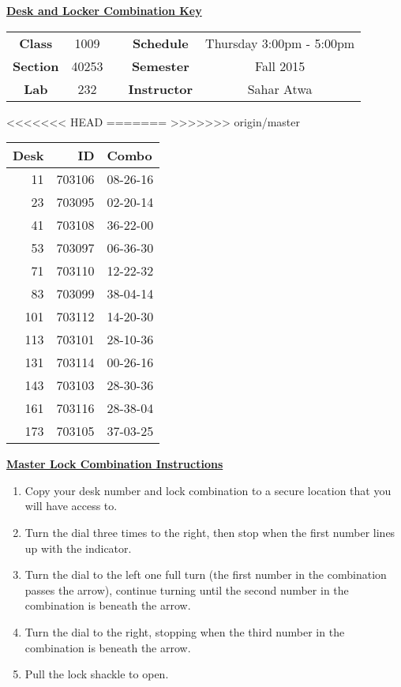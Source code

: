 \documentclass[12pt]{article}
\begin{document}
\thispagestyle{empty}

\begin{center}
	{\huge\textbf{\underline{ Desk and Locker Combination Key}}}
\end{center}


\begin{table}[h]
  \centering
  \begin{tabular}{ccccc}

  \textbf{Class} & 1009 & {\qquad} &\textbf{Schedule} & Thursday 3:00pm - 5:00pm \\
  \textbf{Section} & 40253 & {\qquad} & \textbf{Semester} & Fall 2015 \\
  \textbf{Lab} & 232 & {\qquad} & \textbf{Instructor} & Sahar Atwa \\
  \end{tabular}
\end{table}
<<<<<<< HEAD
 \vspace{0.1in}
=======
 \vspace{0.5in}
>>>>>>> origin/master
\begin{minipage}{0.4\textwidth}

\begin{tabular}{rrl}
\toprule
 Desk &      ID &     Combo \\
\midrule
   11 &  703106 &  08-26-16 \\
   23 &  703095 &  02-20-14 \\
   41 &  703108 &  36-22-00 \\
   53 &  703097 &  06-36-30 \\
   71 &  703110 &  12-22-32 \\
   83 &  703099 &  38-04-14 \\
  101 &  703112 &  14-20-30 \\
  113 &  703101 &  28-10-36 \\
  131 &  703114 &  00-26-16 \\
  143 &  703103 &  28-30-36 \\
  161 &  703116 &  28-38-04 \\
  173 &  703105 &  37-03-25 \\
\bottomrule
\end{tabular}


\end{minipage}
\begin{minipage}{0.4\textwidth}
\underline{{\large \textbf{Master Lock Combination Instructions}}}
\begin{enumerate}
\item Copy your desk number and lock combination to a secure location that you will have access to.
\item Turn the dial three times to the right, then stop when the first number lines up with the indicator.
\item Turn the dial to the left one full turn (the first number in the combination passes the arrow), continue turning until the second number in the combination is beneath the arrow.
\item Turn the dial to the right, stopping when the third number in the combination is beneath the arrow.
\item Pull the lock shackle to open.
\end{enumerate}
\end{minipage}
\end{document}
